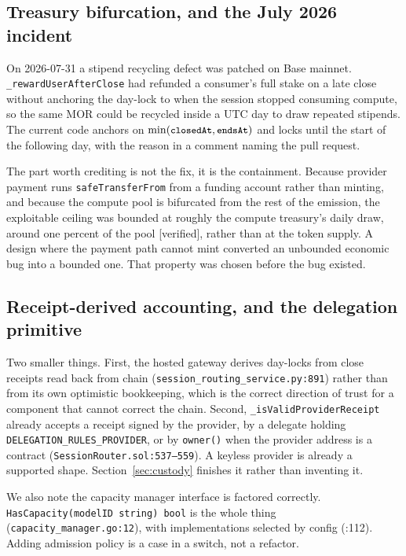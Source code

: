 \documentclass[11pt,a4paper]{article}
\newcommand{\code}[1]{\texttt{\small #1}}
\begin{document}
\subsection{Treasury bifurcation, and the July 2026 incident}

On 2026-07-31 a stipend recycling defect was patched on Base mainnet.
\code{\_rewardUserAfterClose} had refunded a consumer's full stake on a late
close without anchoring the day-lock to when the session stopped consuming
compute, so the same MOR could be recycled inside a UTC day to draw repeated
stipends. The current code anchors on $\min(\code{closedAt},\code{endsAt})$ and
locks until the start of the following day, with the reason in a comment
naming the pull request.

The part worth crediting is not the fix, it is the containment. Because provider
payment runs \code{safeTransferFrom} from a funding account rather than minting,
and because the compute pool is bifurcated from the rest of the emission, the
exploitable ceiling was bounded at roughly the compute treasury's daily draw,
around one percent of the pool [verified], rather than at the token supply. A design where
the payment path cannot mint converted an unbounded economic bug into a bounded
one. That property was chosen before the bug existed.

\subsection{Receipt-derived accounting, and the delegation primitive}

Two smaller things. First, the hosted gateway derives day-locks from close
receipts read back from chain
(\code{session\_routing\_service.py:891}) rather than from its own optimistic
bookkeeping, which is the correct direction of trust for a component that cannot
correct the chain. Second, \code{\_isValidProviderReceipt} already accepts a
receipt signed by the provider, by a delegate holding
\code{DELEGATION\_RULES\_PROVIDER}, or by \code{owner()} when the provider
address is a contract (\code{SessionRouter.sol:537--559}). A keyless provider is
already a supported shape. Section~\ref{sec:custody} finishes it rather than
inventing it.

We also note the capacity manager interface is factored correctly.
\code{HasCapacity(modelID string) bool} is the whole thing
(\code{capacity\_manager.go:12}), with implementations selected by config
(:112). Adding admission policy is a case in a switch, not a refactor.
\end{document}
